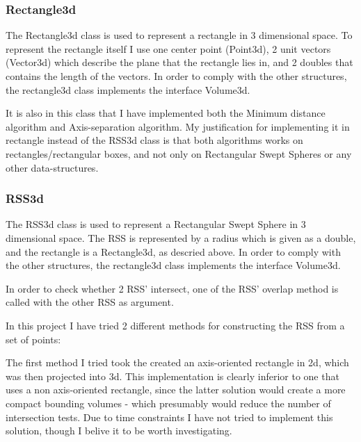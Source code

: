 \subsubsection{Rectangle3d}
\label{rectangle3d}
The Rectangle3d class is used to represent a rectangle in 3 dimensional space. To represent the rectangle itself I use one center point (Point3d), 2 unit vectors (Vector3d) which describe the plane that the rectangle lies in, and 2 doubles that contains the length of the vectors. In order to comply with the other structures, the rectangle3d class implements the interface Volume3d.

It is also in this class that I have implemented both the Minimum distance algorithm and Axis-separation algorithm. My justification for implementing it in rectangle instead of the RSS3d class is that both algorithms works on rectangles/rectangular boxes, and not only on Rectangular Swept Spheres or any other data-structures.

\subsubsection{RSS3d}
\label{RSS3d}
The RSS3d class is used to represent a Rectangular Swept Sphere in 3 dimensional space. The RSS is represented by a radius which is given as a double, and the rectangle is a Rectangle3d, as descried above. In order to comply with the other structures, the rectangle3d class implements the interface Volume3d.

In order to check whether 2 RSS' intersect, one of the RSS' overlap method is called with the other RSS as argument.

In this project I have tried 2 different methods for constructing the RSS from a set of points:

The first method I tried took the created an axis-oriented rectangle in 2d, which was then projected into 3d. This implementation is clearly inferior to one that uses a non axis-oriented rectangle, since the latter solution would create a more compact bounding volumes - which presumably would reduce the number of intersection tests. Due to time constraints I have not tried to implement this solution, though I belive it to be worth investigating. 
